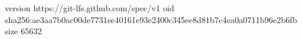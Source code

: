 version https://git-lfs.github.com/spec/v1
oid sha256:ae3aa7b0ac00de7731ee40161e93e2400c345ee8d81b7c4ea0a0711b96e2b6fb
size 65632
